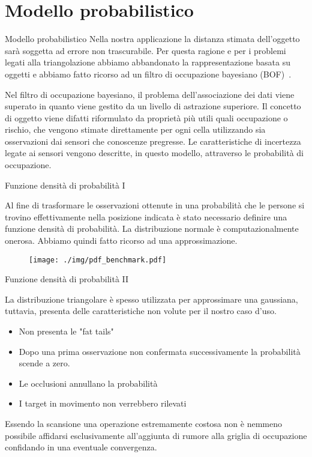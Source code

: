 \documentclass[aspectratio=169, leqno]{beamer}
\begin{document}
	\section{Modello probabilistico}\label{sec:Modello-probabilistico}
	\frame{\sectionpage}
	\begin{frame}{Modello probabilistico}
	Nella nostra applicazione la distanza stimata
	dell'oggetto sarà soggetta ad errore non trascurabile. Per questa
	ragione e per i problemi legati alla triangolazione abbiamo abbandonato la
	rappresentazione basata su oggetti e abbiamo fatto ricorso ad un filtro di
	occupazione bayesiano (BOF)~\cite{tay2008bayesian}.
	
	Nel filtro di occupazione bayesiano, il problema dell'associazione dei dati viene superato in quanto
	viene gestito da un livello di astrazione superiore. Il concetto di oggetto
	viene difatti riformulato da proprietà più utili quali occupazione o
	rischio, che vengono stimate direttamente per ogni cella utilizzando sia
	osservazioni dai sensori che conoscenze pregresse. Le caratteristiche di
	incertezza legate ai sensori vengono descritte, in questo modello,
	attraverso le probabilità di occupazione.
	\end{frame}
	\begin{frame}{Funzione densità di probabilità I}
	
	Al fine di trasformare le osservazioni ottenute in una probabilità che le
	persone si trovino effettivamente nella posizione indicata è stato
	necessario definire una funzione densità di probabilità. La distribuzione
	normale è computazionalmente onerosa. Abbiamo quindi fatto ricorso ad una
	approssimazione.
	
	
	
	\begin{figure}[ht]
		\centering
		\texttt{[image: ./img/pdf\_benchmark.pdf]}
		\label{fig:pdf_benchmark}
	\end{figure}
	
	\end{frame}
	\begin{frame}{Funzione densità di probabilità II}
	
	La distribuzione triangolare è spesso utilizzata per approssimare una
	gaussiana, tuttavia, presenta delle caratteristiche non volute per il
	nostro caso d'uso. 
	
	\begin{itemize}
		\justifying
		\pause\item Non presenta le "fat tails"
		\pause\item Dopo una prima osservazione non confermata successivamente la probabilità scende a zero.
		\pause\item Le occlusioni annullano la probabilità
		\pause\item I target in movimento non verrebbero rilevati
	\end{itemize}
	
	\pause Essendo la scansione una operazione estremamente costosa non è nemmeno
	possibile affidarsi esclusivamente all'aggiunta di rumore alla griglia di
	occupazione confidando in una eventuale convergenza.

	\end{frame}
\end{document}
